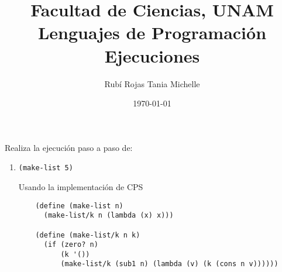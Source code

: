\documentclass[letterpaper,11pt]{article}
\title{Facultad de Ciencias, UNAM \\ 
       Lenguajes de Programación\\
       Ejecuciones}
\author{Rubí Rojas Tania Michelle}
\date{\today}
\begin{document}
\maketitle

Realiza la ejecución paso a paso de:

\begin{enumerate}
    \item \texttt{(make-list 5)}

    Usando la implementación de CPS
    \begin{verbatim}
    (define (make-list n)
      (make-list/k n (lambda (x) x)))

    (define (make-list/k n k)
      (if (zero? n)
          (k '())
          (make-list/k (sub1 n) (lambda (v) (k (cons n v))))))
    \end{verbatim}


\end{enumerate}
\end{document}
